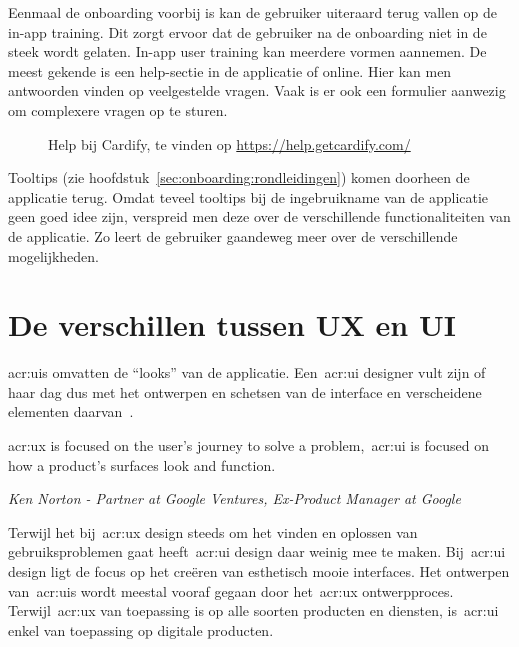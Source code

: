 Eenmaal de onboarding voorbij is kan de gebruiker uiteraard terug vallen op de in-app training. Dit zorgt ervoor dat de gebruiker na de onboarding niet in de steek wordt gelaten. In-app user training kan meerdere vormen aannemen. De meest gekende is een help-sectie in de applicatie of online. Hier kan men antwoorden vinden op veelgestelde vragen. Vaak is er ook een formulier aanwezig om complexere vragen op te sturen.

\begin{figure}
    \centering
    \qquad
    \caption[Voorbeeld help-sectie]{Help bij Cardify, te vinden op \url{https://help.getcardify.com/}}
    \label{fig:inapptraining:help}
\end{figure}

Tooltips (zie hoofdstuk~\ref{sec:onboarding:rondleidingen}) komen doorheen de applicatie terug. Omdat teveel tooltips bij de ingebruikname van de applicatie geen goed idee zijn, verspreid men deze over de verschillende functionaliteiten van de applicatie. Zo leert de gebruiker gaandeweg meer over de verschillende mogelijkheden.

\section{De verschillen tussen UX en UI}
\label{sec:ux-vs-ui}

\Glspl{acr:ui} omvatten de ``looks'' van de applicatie. Een~\acrshort{acr:ui} designer vult zijn of haar dag dus met het ontwerpen en schetsen van de interface en verscheidene elementen daarvan~\autocite{Lamprecht2019}.

\epigraph{\acrshort{acr:ux} is focused on the user’s journey to solve a problem,~\acrshort{acr:ui} is focused on how a product’s surfaces look and function.}{\textit{Ken Norton - Partner at Google Ventures, Ex-Product Manager at Google}}

Terwijl het bij~\acrshort{acr:ux} design steeds om het vinden en oplossen van gebruiksproblemen gaat heeft~\acrshort{acr:ui} design daar weinig mee te maken. Bij~\acrshort{acr:ui} design ligt de focus op het creëren van esthetisch mooie interfaces. Het ontwerpen van~\glspl{acr:ui} wordt meestal vooraf gegaan door het~\acrshort{acr:ux} ontwerpproces. Terwijl~\acrshort{acr:ux} van toepassing is op alle soorten producten en diensten, is~\acrshort{acr:ui} enkel van toepassing op digitale producten.

